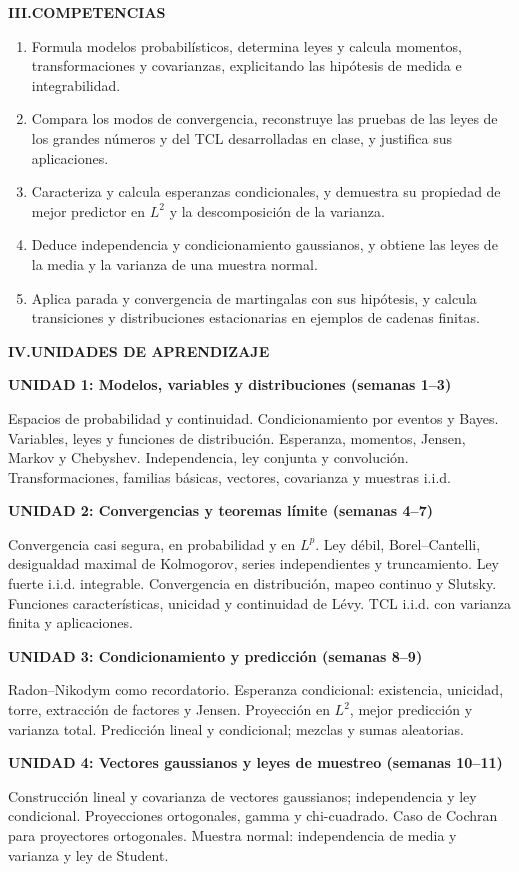 \documentclass[10pt,a4paper]{article}
\newcommand{\seccion}[1]{\vspace{5pt}\noindent\textbf{#1}\par\vspace{2pt}}
\newcommand{\unidad}[1]{\vspace{3pt}\noindent\textbf{#1}\par\vspace{1pt}}
\begin{document}
\seccion{III.\quad COMPETENCIAS}
\begin{enumerate}[leftmargin=8mm,itemsep=1pt,topsep=1pt]
\item Formula modelos probabilísticos, determina leyes y calcula momentos, transformaciones y covarianzas, explicitando las hipótesis de medida e integrabilidad.
\item Compara los modos de convergencia, reconstruye las pruebas de las leyes de los grandes números y del TCL desarrolladas en clase, y justifica sus aplicaciones.
\item Caracteriza y calcula esperanzas condicionales, y demuestra su propiedad de mejor predictor en $L^2$ y la descomposición de la varianza.
\item Deduce independencia y condicionamiento gaussianos, y obtiene las leyes de la media y la varianza de una muestra normal.
\item Aplica parada y convergencia de martingalas con sus hipótesis, y calcula transiciones y distribuciones estacionarias en ejemplos de cadenas finitas.
\end{enumerate}

\seccion{IV.\quad UNIDADES DE APRENDIZAJE}
\unidad{UNIDAD 1: Modelos, variables y distribuciones (semanas 1--3)}
Espacios de probabilidad y continuidad. Condicionamiento por eventos y Bayes. Variables, leyes y funciones de distribución. Esperanza, momentos, Jensen, Markov y Chebyshev. Independencia, ley conjunta y convolución. Transformaciones, familias básicas, vectores, covarianza y muestras i.i.d.

\unidad{UNIDAD 2: Convergencias y teoremas límite (semanas 4--7)}
Convergencia casi segura, en probabilidad y en $L^p$. Ley débil, Borel--Cantelli, desigualdad maximal de Kolmogorov, series independientes y truncamiento. Ley fuerte i.i.d. integrable. Convergencia en distribución, mapeo continuo y Slutsky. Funciones características, unicidad y continuidad de Lévy. TCL i.i.d. con varianza finita y aplicaciones.

\unidad{UNIDAD 3: Condicionamiento y predicción (semanas 8--9)}
Radon--Nikodym como recordatorio. Esperanza condicional: existencia, unicidad, torre, extracción de factores y Jensen. Proyección en $L^2$, mejor predicción y varianza total. Predicción lineal y condicional; mezclas y sumas aleatorias.

\unidad{UNIDAD 4: Vectores gaussianos y leyes de muestreo (semanas 10--11)}
Construcción lineal y covarianza de vectores gaussianos; independencia y ley condicional. Proyecciones ortogonales, gamma y chi-cuadrado. Caso de Cochran para proyectores ortogonales. Muestra normal: independencia de media y varianza y ley de Student.
\end{document}
